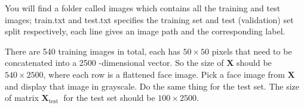 \documentclass[10pt, a4paper]{article}
\begin{document}
\begin{Problem*}
You will find a folder called images which contains all the training and test images; train.txt and test.txt specifies the training set and test (validation) set split respectively, each line gives an image path and the corresponding label.
\end{Problem*}

\begin{Problem*}
There are 540 training images in total, each has $50 \times 50$ pixels that need to be concatenated into a 2500 -dimensional vector. So the size of $\mathbf{X}$ should be $540 \times 2500$, where each row is a flattened face image. Pick a face image from $\mathbf{X}$ and display that image in grayscale. Do the same thing for the test set. The size of matrix $\mathbf{X}_{\text {test }}$ for the test set should be $100 \times 2500$.
\end{Problem*}
\end{document}
